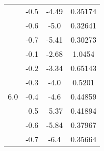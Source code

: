 \begin{table}[htp!]
{\begin{tabular}{|c|c|c|c|}
\cline{2-4}
& -0.5 & -4.49 & 0.35174\\
\cline{2-4}
& -0.6 & -5.0 & 0.32641\\
\cline{2-4}
& -0.7 & -5.41 & 0.30273\\
\hline
\multirow{7}{*}{6.0}
 & -0.1 & -2.68 & 1.0454\\
\cline{2-4}
& -0.2 & -3.34 & 0.65143\\
\cline{2-4}
& -0.3 & -4.0 & 0.5201\\
\cline{2-4}
& -0.4 & -4.6 & 0.44859\\
\cline{2-4}
& -0.5 & -5.37 & 0.41894\\
\cline{2-4}
& -0.6 & -5.84 & 0.37967\\
\cline{2-4}
& -0.7 & -6.4 & 0.35664\\
\hline

            \end{tabular}
        }  %
    \end{table}
        